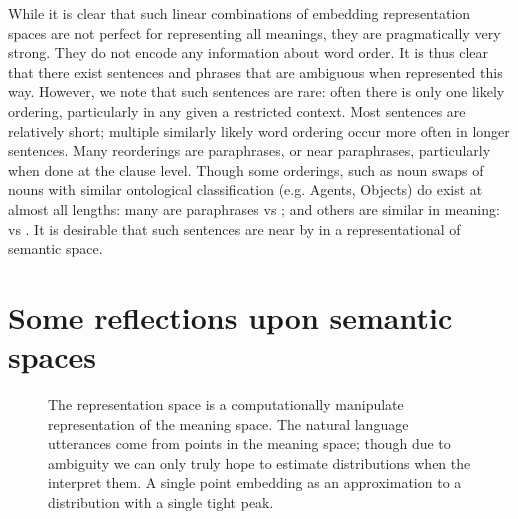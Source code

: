 \documentclass{book}
\begin{document}
While it is clear that such linear combinations of embedding  representation spaces are not perfect for representing all meanings,
they are pragmatically very strong.
They do not encode any information about word order.
It is thus clear that there exist sentences and phrases that are ambiguous when represented this way.
However, we note that such sentences are rare: often there is only one likely ordering, particularly in any given  a restricted context.
Most sentences are relatively short; multiple similarly likely word ordering occur more often in longer sentences.
Many reorderings are paraphrases, or near paraphrases, particularly when done at the clause level.
Though some orderings, such as noun swaps of nouns with similar ontological classification (e.g. Agents, Objects) do exist at almost all lengths:
many are paraphrases  vs ;
and others are similar in meaning:  vs .
It is desirable that such sentences are near by in a representational of semantic space.

\section{Some reflections upon semantic spaces}
\begin{figure}
	\centering
	\caption{\label{fig:spaces} The representation space is a computationally manipulate representation of the meaning space.
		The natural language utterances come from points in the meaning space; though due to ambiguity we can only truly hope to estimate distributions when the interpret them. A single point embedding as an approximation to a distribution with a single tight peak.}
\end{figure}
\end{document}
